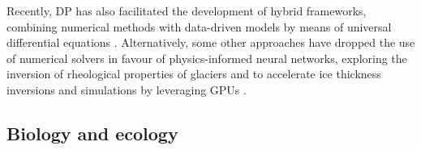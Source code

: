 Recently, DP has also facilitated the development of hybrid frameworks, combining numerical methods with data-driven models by means of universal differential equations \cite{BolibarSapienza_UDEs}. 
Alternatively, some other approaches have dropped the use of numerical solvers in favour of physics-informed neural networks, exploring the inversion of rheological properties of glaciers \cite{wang2022discovering} and to accelerate ice thickness inversions and simulations by leveraging GPUs \cite{Jouvet_Cordonnier_Kim_Lüthi_Vieli_Aschwanden_2021, jouvet2023inversion}. 


\subsection{Biology and ecology}

